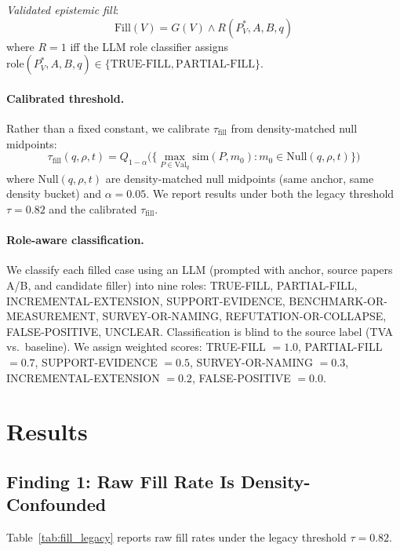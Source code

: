 \documentclass[sigconf]{acmart}
\newcommand{\valq}{\mathrm{Val}_{q}}
\newcommand{\taufill}{\tau_{\mathrm{fill}}}
\begin{document}
\emph{Validated epistemic fill}:
\begin{equation}
\mathrm{Fill}(V) = G(V) \wedge R(P_V^*, A, B, q)
\end{equation}
where $R=1$ iff the LLM role classifier assigns
$\mathrm{role}(P_V^*,A,B,q) \in \{\mathrm{TRUE\text{-}FILL}, \mathrm{PARTIAL\text{-}FILL}\}$.

\paragraph{Calibrated threshold.}
Rather than a fixed constant, we calibrate $\taufill$ from density-matched null midpoints:
\begin{equation}
\taufill(q,\rho,t) =
Q_{1-\alpha}\bigl(\{\max_{P \in \valq}\mathrm{sim}(P,m_0)
  : m_0 \in \mathrm{Null}(q,\rho,t)\}\bigr)
\end{equation}
where $\mathrm{Null}(q,\rho,t)$ are density-matched null midpoints (same anchor,
same density bucket) and $\alpha=0.05$.
We report results under both the legacy threshold $\tau=0.82$ and the calibrated $\taufill$.

\paragraph{Role-aware classification.}
We classify each filled case using an LLM (prompted with anchor, source papers A/B,
and candidate filler) into nine roles: TRUE-FILL, PARTIAL-FILL, INCREMENTAL-EXTENSION,
SUPPORT-EVIDENCE, BENCHMARK-OR-MEASUREMENT, SURVEY-OR-NAMING,
REFUTATION-OR-COLLAPSE, FALSE-POSITIVE, UNCLEAR.
Classification is blind to the source label (TVA vs.\ baseline).
We assign weighted scores: TRUE-FILL $=1.0$, PARTIAL-FILL $=0.7$,
SUPPORT-EVIDENCE $=0.5$, SURVEY-OR-NAMING $=0.3$, INCREMENTAL-EXTENSION $=0.2$,
FALSE-POSITIVE $=0.0$.

\section{Results}
\label{sec:results}

\subsection{Finding 1: Raw Fill Rate Is Density-Confounded}
\label{sec:finding1}

Table~\ref{tab:fill_legacy} reports raw fill rates under the legacy threshold $\tau=0.82$.
\end{document}
